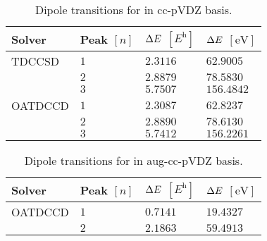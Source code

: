         \begin{table}
            \centering
            \caption{Dipole transitions for  in cc-pVDZ basis.}
            \renewcommand{\arraystretch}{1.3}
            \begin{tabular}{@{}llll@{}}
                \toprule
                Solver & Peak $[n]$
                & $\Delta E$ $[\si{\hartree}]$
                & $\Delta E$ $[\si{\electronvolt}]$
                \\
                \midrule
                TDCCSD & $1$ & $2.3116$ & $62.9005$ \\
                & $2$ & $2.8879$ & $78.5830$ \\
                & $3$ & $5.7507$ & $156.4842$ \\
                OATDCCD & $1$ & $2.3087$ & $62.8237$ \\
                & $2$ & $2.8890$ & $78.6130$ \\
                & $3$ & $5.7412$ & $156.2261$ \\
                \bottomrule
            \end{tabular}
            \label{tab:dipole-ne-cc-pvdz}
        \end{table}

        \begin{table}
            \centering
            \caption{Dipole transitions for  in aug-cc-pVDZ basis.}
            \renewcommand{\arraystretch}{1.3}
            \begin{tabular}{@{}llll@{}}
                \toprule
                Solver & Peak $[n]$
                & $\Delta E$ $[\si{\hartree}]$
                & $\Delta E$ $[\si{\electronvolt}]$
                \\
                \midrule
                OATDCCD & $1$ & $0.7141$ & $19.4327$ \\
                & $2$ & $2.1863$ & $59.4913$ \\
                \bottomrule
            \end{tabular}
            \label{tab:dipole-ne-aug-cc-pvdz}
        \end{table}


